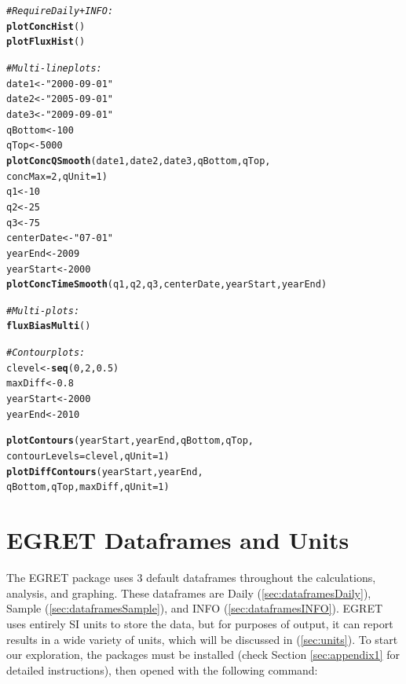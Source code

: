 \documentclass[a4paper,11pt]{article}\usepackage[]{graphicx}\usepackage[]{color}
\makeatletter
\newcommand{\hlnum}[1]{\textcolor[rgb]{0.686,0.059,0.569}{#1}}%
\newcommand{\hlstr}[1]{\textcolor[rgb]{0.192,0.494,0.8}{#1}}%
\newcommand{\hlcom}[1]{\textcolor[rgb]{0.678,0.584,0.686}{\textit{#1}}}%
\newcommand{\hlstd}[1]{\textcolor[rgb]{0.345,0.345,0.345}{#1}}%
\newcommand{\hlkwb}[1]{\textcolor[rgb]{0.69,0.353,0.396}{#1}}%
\newcommand{\hlkwc}[1]{\textcolor[rgb]{0.333,0.667,0.333}{#1}}%
\newcommand{\hlkwd}[1]{\textcolor[rgb]{0.737,0.353,0.396}{\textbf{#1}}}%
\newenvironment{kframe}{%
 \def\at@end@of@kframe{}%
 \ifinner\ifhmode%
  \def\at@end@of@kframe{\end{minipage}}%
  \begin{minipage}{\columnwidth}%
 \fi\fi%
 \def\FrameCommand##1{\hskip\@totalleftmargin \hskip-\fboxsep
 \colorbox{shadecolor}{##1}\hskip-\fboxsep
     \hskip-\linewidth \hskip-\@totalleftmargin \hskip\columnwidth}%
 \MakeFramed {\advance\hsize-\width
   \@totalleftmargin\z@ \linewidth\hsize
   \@setminipage}}%
 {\par\unskip\endMakeFramed%
 \at@end@of@kframe}
\newenvironment{knitrout}{}{} %
\makeatother
\begin{document}
\begin{knitrout}
\begin{kframe}
\begin{alltt}
\hlcom{#Require Daily + INFO:}
\hlkwd{plotConcHist}\hlstd{()}
\hlkwd{plotFluxHist}\hlstd{()}

\hlcom{# Multi-line plots:}
\hlstd{date1} \hlkwb{<-} \hlstr{"2000-09-01"}
\hlstd{date2} \hlkwb{<-} \hlstr{"2005-09-01"}
\hlstd{date3} \hlkwb{<-} \hlstr{"2009-09-01"}
\hlstd{qBottom}\hlkwb{<-}\hlnum{100}
\hlstd{qTop}\hlkwb{<-}\hlnum{5000}
\hlkwd{plotConcQSmooth}\hlstd{(date1, date2, date3, qBottom, qTop,}
                   \hlkwc{concMax}\hlstd{=}\hlnum{2}\hlstd{,}\hlkwc{qUnit}\hlstd{=}\hlnum{1}\hlstd{)}
\hlstd{q1} \hlkwb{<-} \hlnum{10}
\hlstd{q2} \hlkwb{<-} \hlnum{25}
\hlstd{q3} \hlkwb{<-} \hlnum{75}
\hlstd{centerDate} \hlkwb{<-} \hlstr{"07-01"}
\hlstd{yearEnd} \hlkwb{<-} \hlnum{2009}
\hlstd{yearStart} \hlkwb{<-} \hlnum{2000}
\hlkwd{plotConcTimeSmooth}\hlstd{(q1, q2, q3, centerDate, yearStart, yearEnd)}

\hlcom{# Multi-plots:}
\hlkwd{fluxBiasMulti}\hlstd{()}

\hlcom{#Contour plots:}
\hlstd{clevel}\hlkwb{<-}\hlkwd{seq}\hlstd{(}\hlnum{0}\hlstd{,}\hlnum{2}\hlstd{,}\hlnum{0.5}\hlstd{)}
\hlstd{maxDiff}\hlkwb{<-}\hlnum{0.8}
\hlstd{yearStart} \hlkwb{<-} \hlnum{2000}
\hlstd{yearEnd} \hlkwb{<-} \hlnum{2010}

\hlkwd{plotContours}\hlstd{(yearStart,yearEnd,qBottom,qTop,}
             \hlkwc{contourLevels} \hlstd{= clevel,}\hlkwc{qUnit}\hlstd{=}\hlnum{1}\hlstd{)}
\hlkwd{plotDiffContours}\hlstd{(yearStart,yearEnd,}
                 \hlstd{qBottom,qTop,maxDiff,}\hlkwc{qUnit}\hlstd{=}\hlnum{1}\hlstd{)}
\end{alltt}
\end{kframe}
\end{knitrout}


\section{EGRET Dataframes and Units}
\label{sec:dataframes}
The EGRET package uses 3 default dataframes throughout the calculations, analysis, and graphing. These dataframes are Daily (\ref{sec:dataframesDaily}), Sample (\ref{sec:dataframesSample}), and INFO (\ref{sec:dataframesINFO}). EGRET uses entirely SI units to store the data, but for purposes of output, it can report results in a wide variety of units, which will be discussed in (\ref{sec:units}). To start our exploration, the packages must be installed (check Section \ref{sec:appendix1} for detailed instructions), then opened with the following command:
\end{document}
